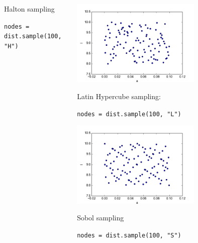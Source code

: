 \documentclass[handout]{beamer}
\begin{document}
\begin{frame}[fragile]
\begin{columns}
\begin{center}
                Halton sampling

                \scriptsize
                \verb;nodes = dist.sample(100, "H");
                \normalsize

     \end{center}
     \begin{center}
                  \includegraphics[width=0.65\textwidth]{samples_L.png}

                Latin Hypercube sampling:

                \scriptsize
                \verb;nodes = dist.sample(100, "L");
                \normalsize



                \includegraphics[width=0.65\textwidth]{samples_S.png}

                Sobol sampling

                \scriptsize
                \verb;nodes = dist.sample(100, "S");
                \normalsize
     \end{center}
 \end{columns}
\end{frame}
\end{document}
